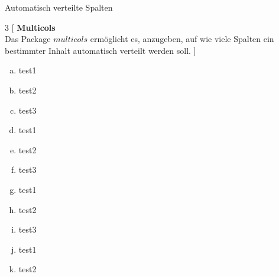 \documentclass[ngerman,14pt,aspectratio=1610]{beamer}
\begin{document}
	\begin{frame}{Automatisch verteilte Spalten}
		\begin{multicols*}{3}
			[
			\textbf{Multicols} \\
			Das Package $multicols$ ermöglicht es, anzugeben, auf wie viele Spalten ein bestimmter Inhalt automatisch verteilt werden soll.
			]
			\begin{enumerate}[a)]
				\item test1
				\item test2
				\item test3
				\item test1
				\item test2
				\item test3
				\item test1
				\item test2
				\item test3
				\item test1
				\item test2
			\end{enumerate}
		\end{multicols*}
	\end{frame}
	
\end{document}
